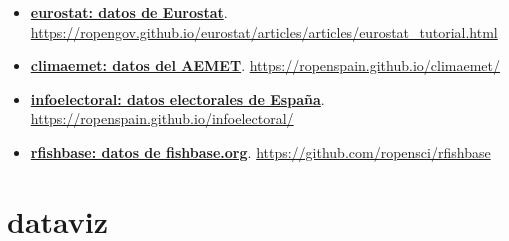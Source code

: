 \documentclass[11pt,]{book}
\begin{document}
\begin{itemize}
\item
  \href{https://ropengov.github.io/eurostat/articles/articles/eurostat_tutorial.html}{\textbf{eurostat: datos de Eurostat}}. \url{https://ropengov.github.io/eurostat/articles/articles/eurostat_tutorial.html}
\item
  \href{https://ropenspain.github.io/climaemet/}{\textbf{climaemet: datos del AEMET}}. \url{https://ropenspain.github.io/climaemet/}
\item
  \href{https://ropenspain.github.io/infoelectoral/}{\textbf{infoelectoral: datos electorales de España}}. \url{https://ropenspain.github.io/infoelectoral/}
\item
  \href{https://github.com/ropensci/rfishbase}{\textbf{rfishbase: datos de fishbase.org}}. \url{https://github.com/ropensci/rfishbase}
\end{itemize}

\hypertarget{dataviz}{%
\section*{dataviz}\label{dataviz}}
\end{document}

